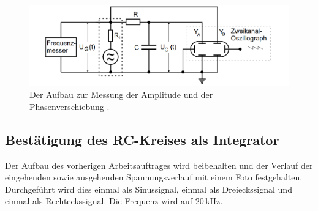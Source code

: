 \begin{figure}[H]      
    \centering
    \includegraphics[width=140mm]{bilder/Abbildung3.png}
    \caption{Der Aufbau zur Messung der Amplitude und der Phasenverschiebung \cite{a1}.\label{Abbildung3} }
\end{figure}

\subsection{Bestätigung des RC-Kreises als Integrator}

\begin{flushleft}
    Der Aufbau des vorherigen Arbeitsauftrages wird beibehalten und der Verlauf der eingehenden sowie ausgehenden Spannungsverlauf mit einem Foto festgehalten.
    Durchgeführt wird dies einmal als Sinussignal, einmal als Dreieckssignal und einmal als Rechteckssignal. Die Frequenz wird auf $20\,\unit{\kilo\hertz}$.
\end{flushleft}
